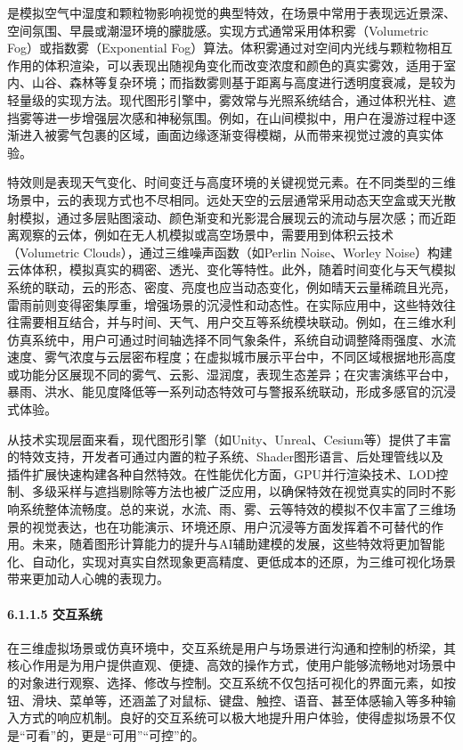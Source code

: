 是模拟空气中湿度和颗粒物影响视觉的典型特效，在场景中常用于表现远近景深、空间氛围、早晨或潮湿环境的朦胧感。实现方式通常采用体积雾（Volumetric Fog）或指数雾（Exponential Fog）算法。体积雾通过对空间内光线与颗粒物相互作用的体积渲染，可以表现出随视角变化而改变浓度和颜色的真实雾效，适用于室内、山谷、森林等复杂环境；而指数雾则基于距离与高度进行透明度衰减，是较为轻量级的实现方法。现代图形引擎中，雾效常与光照系统结合，通过体积光柱、遮挡雾等进一步增强层次感和神秘氛围。例如，在山间模拟中，用户在漫游过程中逐渐进入被雾气包裹的区域，画面边缘逐渐变得模糊，从而带来视觉过渡的真实体验。

特效则是表现天气变化、时间变迁与高度环境的关键视觉元素。在不同类型的三维场景中，云的表现方式也不尽相同。远处天空的云层通常采用动态天空盒或天光散射模拟，通过多层贴图滚动、颜色渐变和光影混合展现云的流动与层次感；而近距离观察的云体，例如在无人机模拟或高空场景中，需要用到体积云技术（Volumetric Clouds），通过三维噪声函数（如Perlin Noise、Worley Noise）构建云体体积，模拟真实的稠密、透光、变化等特性。此外，随着时间变化与天气模拟系统的联动，云的形态、密度、亮度也应当动态变化，例如晴天云量稀疏且光亮，雷雨前则变得密集厚重，增强场景的沉浸性和动态性。在实际应用中，这些特效往往需要相互结合，并与时间、天气、用户交互等系统模块联动。例如，在三维水利仿真系统中，用户可通过时间轴选择不同气象条件，系统自动调整降雨强度、水流速度、雾气浓度与云层密布程度；在虚拟城市展示平台中，不同区域根据地形高度或功能分区展现不同的雾气、云影、湿润度，表现生态差异；在灾害演练平台中，暴雨、洪水、能见度降低等一系列动态特效可与警报系统联动，形成多感官的沉浸式体验。

从技术实现层面来看，现代图形引擎（如Unity、Unreal、Cesium等）提供了丰富的特效支持，开发者可通过内置的粒子系统、Shader图形语言、后处理管线以及插件扩展快速构建各种自然特效。在性能优化方面，GPU并行渲染技术、LOD控制、多级采样与遮挡剔除等方法也被广泛应用，以确保特效在视觉真实的同时不影响系统整体流畅度。总的来说，水流、雨、雾、云等特效的模拟不仅丰富了三维场景的视觉表达，也在功能演示、环境还原、用户沉浸等方面发挥着不可替代的作用。未来，随着图形计算能力的提升与AI辅助建模的发展，这些特效将更加智能化、自动化，实现对真实自然现象更高精度、更低成本的还原，为三维可视化场景带来更加动人心魄的表现力。

\paragraph{6.1.1.5 交互系统}\label{ux4ea4ux4e92ux7cfbux7edf}

在三维虚拟场景或仿真环境中，交互系统是用户与场景进行沟通和控制的桥梁，其核心作用是为用户提供直观、便捷、高效的操作方式，使用户能够流畅地对场景中的对象进行观察、选择、修改与控制。交互系统不仅包括可视化的界面元素，如按钮、滑块、菜单等，还涵盖了对鼠标、键盘、触控、语音、甚至体感输入等多种输入方式的响应机制。良好的交互系统可以极大地提升用户体验，使得虚拟场景不仅是``可看''的，更是``可用''``可控''的。

